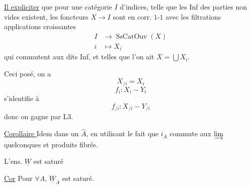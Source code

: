 
\uline{Il  expliciter} que pour une catégorie $I$ d'indices, telle que les Inf des parties non vides existent, les foncteurs $X\longrightarrow I$ sont en corr. $1$-$1$ avec les filtrations  applications croissantes
\[
\begin{aligned}I&\longrightarrow\operatorname{SsCatOuv}(X)\\i&\longmapsto X_i\end{aligned}
\]
qui commutent aux dits Inf, et telles que l'on ait $X=\bigcup X_i$.

Ceci posé, on a
\[
X_{/i}=X_i
\]
\[
f_i:X_i\mathbin{-}Y_i
\]
s'identifie à
\[
f_{/i}:X_{/i}\mathbin{-}Y_{/i}
\]
donc on gagne par L3.

\uline{Corollaire } Idem dans un $\widehat A$, en utilisant le fait que $i_A$ commute aux \uline{$\varinjlim$} quelconques et  produits fibrés.


 L'ens. $\underline W$ est saturé

\uline{Cor} Pour $\forall A$, $\underline W_A$ est saturé.

